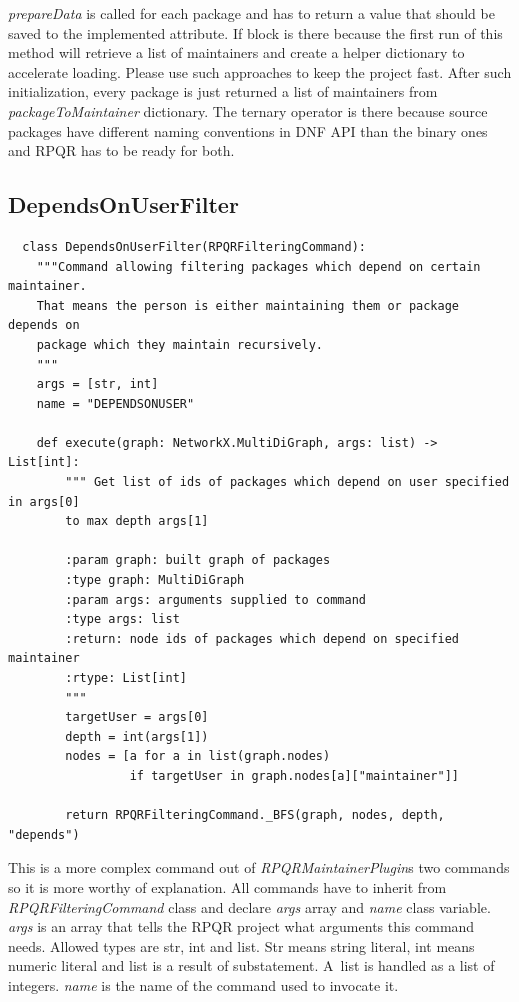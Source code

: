 \textit{prepareData} is called for each package and has to return a value that should be
saved to the implemented attribute. If block is there because the first run of this method will retrieve
a list of maintainers and create a helper dictionary to accelerate loading. Please use such approaches
to keep the project fast. After such initialization, every package is just returned a list of maintainers
from \textit{packageToMaintainer} dictionary. The ternary operator is there because source packages
have different naming conventions in DNF API than the binary ones and RPQR has to be ready for both.

\newpage

\subsection*{DependsOnUserFilter}

\begin{lstlisting}
  class DependsOnUserFilter(RPQRFilteringCommand):
    """Command allowing filtering packages which depend on certain maintainer.
    That means the person is either maintaining them or package depends on
    package which they maintain recursively.
    """
    args = [str, int]
    name = "DEPENDSONUSER"

    def execute(graph: NetworkX.MultiDiGraph, args: list) -> List[int]:
        """ Get list of ids of packages which depend on user specified in args[0]
        to max depth args[1]

        :param graph: built graph of packages
        :type graph: MultiDiGraph
        :param args: arguments supplied to command
        :type args: list
        :return: node ids of packages which depend on specified maintainer
        :rtype: List[int]
        """
        targetUser = args[0]
        depth = int(args[1])
        nodes = [a for a in list(graph.nodes)
                 if targetUser in graph.nodes[a]["maintainer"]]

        return RPQRFilteringCommand._BFS(graph, nodes, depth, "depends")
\end{lstlisting}

This is a more complex command out of \textit{RPQRMaintainerPlugin}s two commands so it is more worthy of
explanation. All commands have to inherit from \textit{RPQRFilteringCommand} class and declare \textit{args}
array and \textit{name} class variable. \textit{args} is an array that tells the RPQR project what arguments
this command needs. Allowed types are str, int and list. Str means string literal, int means numeric
literal and list is a result of substatement. A~list is handled as a list of integers. \textit{name}
is the name of the command used to invocate it.

